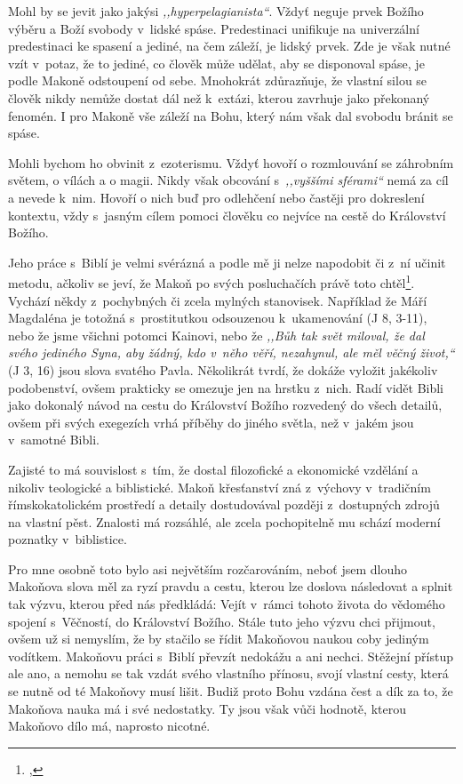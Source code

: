 Mohl by se jevit jako jakýsi \textit{,,hyperpelagianista``}. Vždyť neguje prvek
Božího výběru a Boží svobody v~lidské spáse. Predestinaci unifikuje na
univerzální predestinaci ke spasení a jediné, na čem záleží, je lidský prvek.
Zde je však nutné vzít v~potaz, že to jediné, co člověk může udělat, aby se
disponoval spáse, je podle Makoně odstoupení od sebe. Mnohokrát zdůrazňuje, že
vlastní silou se člověk nikdy nemůže dostat dál než k~extázi, kterou zavrhuje
jako překonaný fenomén. I pro Makoně vše záleží na Bohu, který nám však dal
svobodu bránit se spáse.

Mohli bychom ho obvinit z~ezoterismu. Vždyť hovoří o rozmlouvání se záhrobním
světem, o vílách a o
magii. Nikdy však obcování s~\textit{,,vyššími sférami``}
nemá za cíl a nevede k~nim. Hovoří o nich buď pro odlehčení nebo častěji pro
dokreslení kontextu, vždy s~jasným cílem pomoci člověku co nejvíce na cestě do
Království Božího.

Jeho práce s~Biblí je velmi svérázná a podle mě ji nelze napodobit či z~ní
učinit metodu, ačkoliv se jeví, že Makoň po svých posluchačích právě toto
chtěl\footnote{, }.
Vychází někdy z~pochybných či zcela mylných stanovisek. Například že Máří
Magdaléna je totožná s~prostitutkou odsouzenou k~ukamenování (J 8, 3-11), nebo že jsme
všichni potomci Kainovi, nebo že \textit{,,Bůh tak svět miloval, že dal svého jediného
Syna, aby žádný, kdo v~něho věří, nezahynul, ale měl věčný život,``} (J 3, 16) jsou slova
svatého Pavla. Několikrát tvrdí, že dokáže vyložit jakékoliv
podobenství, ovšem
prakticky se omezuje jen na hrstku z~nich. Radí vidět Bibli jako dokonalý návod
na cestu do Království Božího rozvedený do všech detailů, ovšem při svých
exegezích vrhá příběhy do jiného světla, než v~jakém jsou v~samotné
Bibli.

Zajisté to má souvislost s~tím, že dostal filozofické a ekonomické vzdělání a
nikoliv teologické a biblistické. Makoň křesťanství zná z~výchovy v~tradičním
římskokatolickém prostředí a detaily dostudovával později z~dostupných zdrojů na
vlastní pěst. Znalosti má rozsáhlé, ale zcela pochopitelně mu schází moderní
poznatky v~biblistice.

Pro mne osobně toto bylo asi největším rozčarováním, neboť jsem dlouho Makoňova
slova měl za ryzí pravdu a cestu, kterou lze doslova následovat a splnit tak
výzvu, kterou před nás předkládá: Vejít v~rámci tohoto života do vědomého
spojení s~Věčností, do Království Božího. Stále tuto jeho výzvu chci přijmout,
ovšem už si nemyslím, že by stačilo se řídit Makoňovou naukou coby jediným
vodítkem. Makoňovu práci s~Biblí převzít nedokážu a ani nechci. Stěžejní přístup
ale ano, a nemohu se tak vzdát svého vlastního přínosu, svojí vlastní cesty,
která se nutně od té Makoňovy musí lišit. Budiž proto Bohu vzdána čest a dík za
to, že Makoňova nauka má i své nedostatky. Ty jsou však vůči hodnotě, kterou
Makoňovo dílo má, naprosto nicotné.

